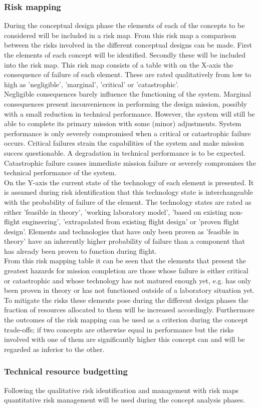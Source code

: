 \subsubsection{Risk mapping}
During the conceptual design phase the elements of each of the concepts to be considered will be included in a risk map. From this risk map a comparison between the risks involved in the different conceptual designs can be made. First the elements of each concept will be identified. Secondly these will be included into the risk map. This risk map consists of a table with on the X-axis the consequence of failure of each element. These are rated qualitatively from low to high as 'negligible', 'marginal', 'critical' or 'catastrophic'. \\
\noindent Negligible consequences barely influence the functioning of the system. Marginal consequences present inconveniences in performing the design mission, possibly with a small reduction in technical performance. However, the system will still be able to complete its primary mission with some (minor) adjustments. System performance is only severely compromised when a critical or catastrophic failure occurs. Critical failures strain the capabilities of the system and make mission succes questionable. A degradation in technical performance is to be expected. Catastrophic failure causes immediate mission failure or severely compromises the technical performance of the system. \\
\noindent On the Y-axis the current state of the technology of each element is presented. It is assumed during risk identification that this technology state is interchangeable with the probability of failure of the element. The technology states are rated as either 'feasible in theory', 'working laboratory model', 'based on existing non-flight engineering', 'extrapolated from existing flight design' or 'proven flight design'. Elements and technologies that have only been proven as 'feasible in theory' have an inherently higher probability of failure than a component that has already been proven to function during flight. \\
\noindent From this risk mapping table it can be seen that the elements that present the greatest hazards for mission completion are those whose failure is either critical or catastrophic and whose technology has not matured enough yet, e.g. has only been proven in theory or has not functioned outside of a laboratory situation yet. To mitigate the risks these elements pose during the different design phases the fraction of resources allocated to them will be increased accordingly.
Furthermore the outcomes of the risk mapping can be used as a criterion during the concept trade-offs; if two concepts are otherwise equal in performance but the risks involved with one of them are significantly higher this concept can and will be regarded as inferior to the other.

\subsubsection{Technical resource budgetting}
Following the qualitative risk identification and management with risk maps quantitative risk management will be used during the concept analysis phases. 